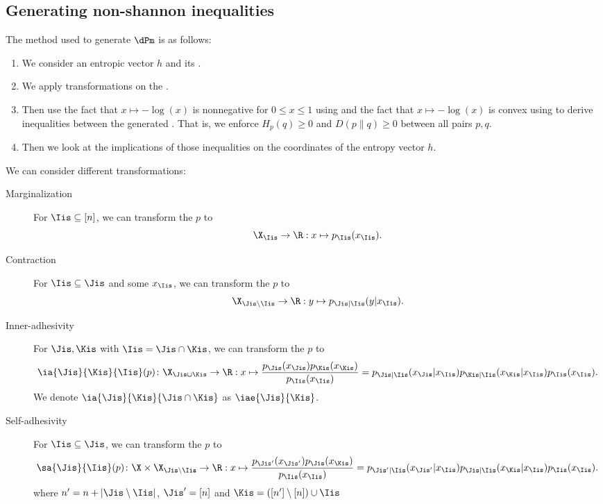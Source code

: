 \documentclass[11pt,twoside,a4paper,openright]{uclouvain-thesis}
\begin{document}
\subsection{Generating non-shannon inequalities}
The method used to generate $\dPm$ is as follows:
\begin{enumerate}
  \item We consider an entropic vector $h$ and its \pmf{}. %
  \item We apply transformations on the \pmf{}.
  \item Then use the fact that $x \mapsto -\log(x)$ is nonnegative for $0 \leq x \leq 1$ using  and the fact that $x \mapsto -\log(x)$ is convex using  to derive inequalities between the generated \pmfs.
    That is, we enforce $H_p(q) \geq 0$ and $D(p\|q) \geq 0$ between all pairs $p, q$.
  \item Then we look at the implications of those inequalities on the coordinates of the entropy vector $h$.
\end{enumerate}

We can consider different transformations:
\begin{description}
  \item[Marginalization]
    For $\Iis \subseteq [n]$, we can transform the \pmf{} $p$ to
    \[ \X_{\Iis} \to \R : x \mapsto p_{\Iis}(x_{\Iis}). \]
  \item[Contraction]
    For $\Iis \subseteq \Jis$ and some $x_{\Iis}$, we can transform the \pmf{} $p$ to
    \[ \X_{\Jis\setminus\Iis} \to \R : y \mapsto p_{\Jis|\Iis}(y|x_{\Iis}). \]
  \item[Inner-adhesivity]
    For $\Jis, \Kis$ with $\Iis = \Jis \cap \Kis$, we can transform the \pmf{} $p$ to
    \begin{equation}
      \label{eq:inneradhtransfo}
      \ia{\Jis}{\Kis}{\Iis}(p) \colon \X_{\Jis\cup\Kis} \to \R : x \mapsto \frac{p_{\Jis}(x_{\Jis})p_{\Kis}(x_{\Kis})}{p_{\Iis}(x_{\Iis})} = p_{\Jis|\Iis}(x_{\Jis}|x_{\Iis})p_{\Kis|\Iis}(x_{\Kis}|x_{\Iis})p_{\Iis}(x_{\Iis}).
    \end{equation}
    We denote $\ia{\Jis}{\Kis}{\Jis \cap \Kis}$ as $\iae{\Jis}{\Kis}$.
  \item[Self-adhesivity]
    For $\Iis \subseteq \Jis$, we can transform the \pmf{} $p$ to
    \begin{equation}
      \label{eq:selfadhtransfo}
      \sa{\Jis}{\Iis}(p) \colon \X \times \X_{\Jis\setminus\Iis} \to \R : x \mapsto \frac{p_{\Jis'}(x_{\Jis'})p_{\Jis}(x_{\Kis})}{p_{\Iis}(x_{\Iis})} = p_{\Jis'|\Iis}(x_{\Jis'}|x_{\Iis})p_{\Jis|\Iis}(x_{\Kis}|x_{\Iis})p_{\Iis}(x_{\Iis}).
    \end{equation}
    where $n' = n + |\Jis \setminus \Iis|$, $\Jis' = [n]$ and $\Kis = ([n'] \setminus [n]) \cup \Iis$
\end{description}
\end{document}
